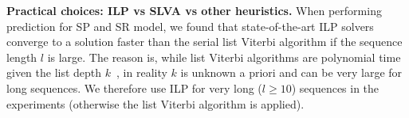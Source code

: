 \textbf{Practical choices: ILP vs SLVA vs other heuristics.}
When performing prediction for SP and SR model, we found that state-of-the-art ILP solvers converge to a solution faster 
than the serial list Viterbi algorithm if the sequence length $l$ is large. 
The reason is, while list Viterbi algorithms are polynomial time given the list depth $k$~\cite{nilsson2001sequentially},
in reality $k$ is unknown a priori and can be very large for long sequences.
We therefore use ILP for very long ($l\ge10$) sequences in the experiments (otherwise the list Viterbi algorithm is applied).






